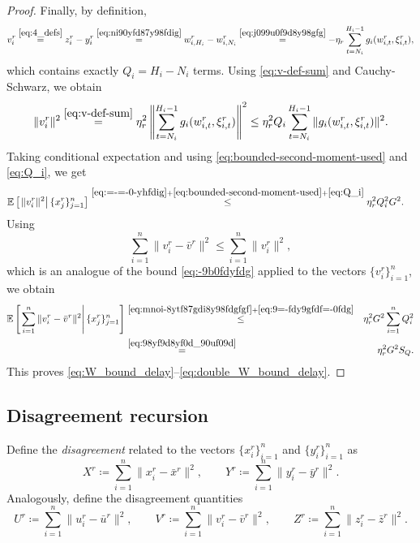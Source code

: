 \documentclass{article}
\newcommand{\eqdef}{\coloneqq}
\newcommand{\ExpCond}[2]{{\mathbb{E}}\left[\left.#1\right\vert#2\right]}
\theoremstyle{plain}
\theoremstyle{definition}
\begin{document}
\begin{proof}
Finally, by definition,
\begin{equation}
v_i^r
\overset{\eqref{eq:4_defs}}{=} z_i^r-y_i^r \overset{\eqref{eq:ni90yfd87y98fdig}}{=}  w_{i,H_i}^r - w_{i,N_i}^r \overset{\eqref{eq:j099u0f9d8y98gfg}}{=}
-\eta_r \sum_{t=N_i}^{H_i-1} g_i(w_{i,t}^r,\xi_{i,t}^r),
\label{eq:v-def-sum}
\end{equation}
which contains exactly \(Q_i = H_i-N_i\) terms. Using \eqref{eq:v-def-sum} and Cauchy-Schwarz, we obtain
\begin{equation}
\|v_i^r\|^2
\overset{\eqref{eq:v-def-sum}}{=} 
\eta_r^2 \left\|\sum_{t=N_i}^{H_i-1} g_i(w_{i,t}^r,\xi_{i,t}^r)\right\|^2
\leq 
\eta_r^2 Q_i \sum_{t=N_i}^{H_i-1} \|g_i(w_{i,t}^r,\xi_{i,t}^r)\|^2.
\label{eq:=-=-0-yhfdig}
\end{equation}
Taking conditional expectation and using \eqref{eq:bounded-second-moment-used} and \eqref{eq:Q_i},
we get
\begin{align}
\ExpCond{\|v_i^r\|^2}{\{x_j^r\}_{j=1}^n}
&\overset{\eqref{eq:=-=-0-yhfdig}+\eqref{eq:bounded-second-moment-used}+\eqref{eq:Q_i}}{\leq}
\eta_r^2 Q_i^2 G^2.
\label{eq:9=-fdy9gfdf=-0fdg}
\end{align}
Using 
\begin{equation}
\sum_{i=1}^n \|v_i^r-\bar v^r\|^2
\le
\sum_{i=1}^n \|v_i^r\|^2,
\label{eq:mnoi-8ytf87gdi8y98fdgfgf}
\end{equation}
which is an analogue of the bound \eqref{eq:-9b0fdyfdg} applied to the vectors \(\{v_i^r\}_{i=1}^n\),
we obtain
\begin{eqnarray*}
\ExpCond{\sum_{i=1}^n \|v_i^r-\bar v^r\|^2}{\{x_j^r\}_{j=1}^n}
&\overset{\eqref{eq:mnoi-8ytf87gdi8y98fdgfgf}+\eqref{eq:9=-fdy9gfdf=-0fdg}}{\le}&
\eta_r^2 G^2 \sum_{i=1}^n Q_i^2
\notag\\
&\overset{\eqref{eq:98yf9d8yf0d_90uf09d}}{=}&
\eta_r^2 G^2 S_Q.
\end{eqnarray*}
This proves \eqref{eq:W_bound_delay}--\eqref{eq:double_W_bound_delay}.
\end{proof}


\subsection{Disagreement recursion}

Define the {\em disagreement} related to the vectors $\{x_i^r\}_{i=1}^n$ and $\{y_i^r\}_{i=1}^n$ as
\begin{equation}\label{eq:-09y9yf8dy8fy098f+-0=-9g}
X^r \eqdef \sum_{i=1}^n \|x_i^r-\bar x^r\|^2, \qquad Y^r \eqdef \sum_{i=1}^n \|y_i^r-\bar y^r\|^2.
\end{equation}
Analogously,  define the disagreement quantities
\begin{equation}\label{eq:three_defs}
U^r \eqdef \sum_{i=1}^n \|u_i^r-\bar u^r\|^2,
\qquad
V^r \eqdef \sum_{i=1}^n \|v_i^r-\bar v^r\|^2,
\qquad
Z^r \eqdef \sum_{i=1}^n \|z_i^r-\bar z^r\|^2.
\end{equation}
\end{document}
